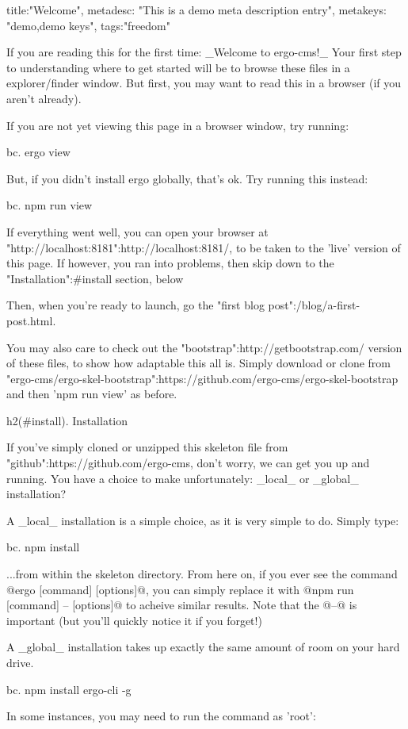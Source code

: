 {
title:"Welcome",
metadesc: "This is a demo meta description entry",
metakeys: "demo,demo keys",
tags:"freedom"
}


If you are reading this for the first time: _Welcome to ergo-cms!_ Your first step to understanding where to get started will be to browse these files in a explorer/finder window. But first, you may want to read this in a browser (if you aren't already).

If you are not yet viewing this page in a browser window, try running:

bc. ergo view

But, if you didn't install ergo globally, that's ok. Try running this instead:

bc. npm run view

If everything went well, you can open your browser at "http://localhost:8181":http://localhost:8181/, to be taken to the 'live' version of this page. If however, you ran into problems, then skip down to the "Installation":#install section, below

Then, when you're ready to launch, go the "first blog post":/blog/a-first-post.html.

You may also care to check out the "bootstrap":http://getbootstrap.com/ version of these files, to show how adaptable this all is. Simply download or clone from "ergo-cms/ergo-skel-bootstrap":https://github.com/ergo-cms/ergo-skel-bootstrap and then 'npm run view' as before.

h2(#install). Installation

If you've simply cloned or unzipped this skeleton file from "github":https://github.com/ergo-cms, don't worry, we can get you up and running. You have a choice to make unfortunately: _local_ or _global_ installation?

A _local_ installation is a simple choice, as it is very simple to do. Simply type:

bc. npm install

...from within the skeleton directory. From here on, if you ever see the command @ergo [command] [options]@, you can simply replace it with @npm run [command] -- [options]@ to acheive similar results. Note that the @--@ is important (but you'll quickly notice it if you forget!)

A _global_ installation takes up exactly the same amount of room on your hard drive. 

bc. npm install ergo-cli -g

In some instances, you may need to run the command as 'root':

